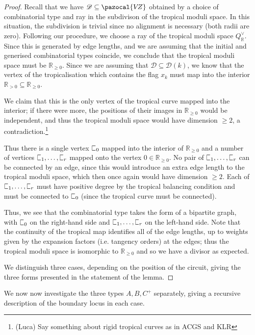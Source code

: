 \documentclass[11pt]{amsart}
\newcommand{\sqC}{\scalebox{0.8}[1.3]{$\sqsubset$}}
\newcommand{\VZ}{\pazocal{V\!Z}}
\newcommand{\Dcal}{\mathcal{D}}
\newcommand{\RR}{\mathbb{R}}
\theoremstyle{definition}
\theoremstyle{definition}
\begin{document}
\begin{proof}
Recall that we have $\Dcal\subseteq\VZ$ obtained by a choice of combinatorial type and ray in the subdivison of the tropical moduli space. In this situation, the subdivision is trivial since no alignment is necessary (both radii are zero). Following our procedure, we choose a ray of the tropical moduli space $Q^\vee_{\RR}$. Since this is generated by edge lengths, and we are assuming that the initial and generised combinatorial types coincide, we conclude that the tropical moduli space must be $\RR_{\geq 0}$. Since we are assuming that $\Dcal \subseteq \Dcal(k)$, we know that the vertex of the tropicalisation which contains the flag $x_k$ must map into the interior $\RR_{>0}\subseteq \RR_{\geq 0}$.

We claim that this is the only vertex of the tropical curve mapped into the interior; if there were more, the positions of their images in $\RR_{\geq 0}$ would be independent, and thus the tropical moduli space would have dimension $\geq 2$, a contradiction.\footnote{(Luca) Say something about rigid tropical curves as in ACGS and KLR}

Thus there is a single vertex $\sqC_0$ mapped into the interior of $\RR_{\geq 0}$ and a number of vertices $\sqC_1,\ldots,\sqC_r$ mapped onto the vertex $0 \in \RR_{\geq 0}$. No pair of $\sqC_1,\ldots,\sqC_r$ can be connected by an edge, since this would introduce an extra edge length to the tropical moduli space, which then once again would have dimension $\geq 2$. Each of $\sqC_1,\ldots,\sqC_r$ must have positive degree by the tropical balancing condition and must be connected to $\sqC_0$ (since the tropical curve must be connected).

Thus, we see that the combinatorial type takes the form of a bipartite graph, with $\sqC_0$ on the right-hand side and $\sqC_1,\ldots,\sqC_r$ on the left-hand side. Note that the continuity of the tropical map identifies all of the edge lengths, up to weights given by the expansion factors (i.e. tangency orders) at the edges; thus the tropical moduli space is isomorphic to $\RR_{\geq 0}$ and so we have a divisor as expected.

We distinguish three cases, depending on the position of the circuit, giving the three forms presented in the statement of the lemma.\end{proof}

We now now investigate the three types $A,B,C^+$ separately, giving a recursive description of the boundary locus in each case.
\end{document}
